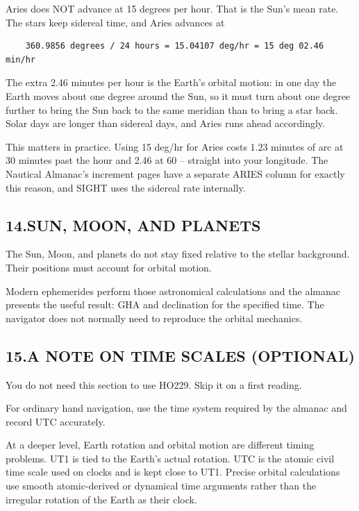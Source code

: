 \documentclass[11pt]{article}
\begin{document}
Aries does NOT advance at 15 degrees per hour. That is the Sun's mean rate. The stars keep sidereal time, and Aries advances at

\begin{verbatim}
    360.9856 degrees / 24 hours = 15.04107 deg/hr = 15 deg 02.46 min/hr
\end{verbatim}

The extra 2.46 minutes per hour is the Earth's orbital motion: in one day the Earth moves about one degree around the Sun, so it must turn about one degree further to bring the Sun back to the same meridian than to bring a star back. Solar days are longer than sidereal days, and Aries runs ahead accordingly.

This matters in practice. Using 15 deg/hr for Aries costs 1.23 minutes of arc at 30 minutes past the hour and 2.46 at 60 -- straight into your longitude. The Nautical Almanac's increment pages have a separate ARIES column for exactly this reason, and SIGHT uses the sidereal rate internally.

\subsection*{14.\quad SUN, MOON, AND PLANETS}

The Sun, Moon, and planets do not stay fixed relative to the stellar background. Their positions must account for orbital motion.

Modern ephemerides perform those astronomical calculations and the almanac presents the useful result: GHA and declination for the specified time. The navigator does not normally need to reproduce the orbital mechanics.

\subsection*{15.\quad A NOTE ON TIME SCALES (OPTIONAL)}

You do not need this section to use HO229. Skip it on a first reading.

For ordinary hand navigation, use the time system required by the almanac and record UTC accurately.

At a deeper level, Earth rotation and orbital motion are different timing problems. UT1 is tied to the Earth's actual rotation. UTC is the atomic civil time scale used on clocks and is kept close to UT1. Precise orbital calculations use smooth atomic-derived or dynamical time arguments rather than the irregular rotation of the Earth as their clock.
\end{document}
